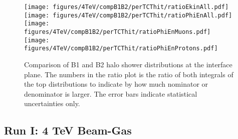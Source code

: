 

\begin{figure}[!htb]
\begin{center}
\texttt{[image: figures/4TeV/compB1B2/perTCThit/ratioEkinAll.pdf]}
\texttt{[image: figures/4TeV/compB1B2/perTCThit/ratioPhiEnAll.pdf]}
\texttt{[image: figures/4TeV/compB1B2/perTCThit/ratioPhiEnMuons.pdf]}
\texttt{[image: figures/4TeV/compB1B2/perTCThit/ratioPhiEnProtons.pdf]}
\end{center}
\vspace{-0.6cm}
 \caption{Comparison of B1 and B2 halo shower distributions at the interface plane. The numbers in the ratio plot is the ratio of both integrals of the top distributions to indicate by how much nominator or denominator is larger. The error bars indicate statistical uncertainties only.
  \label{comp4TeVB1B2}}
\end{figure}


\subsection{Run I: 4 TeV Beam-Gas}

